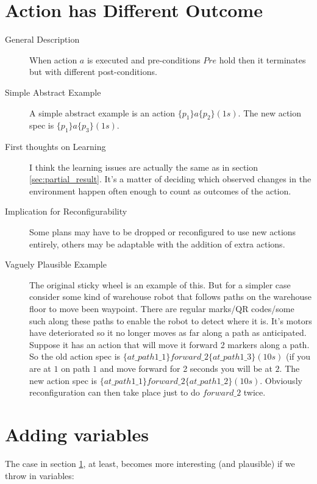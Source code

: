 \documentclass{blue-book}
\newcommand{\actionspec}[4]{\ensuremath{\{#1\}#2\{#3\}(#4)}}
\begin{document}
\section{Action has Different Outcome}
\label{sec:different}

\begin{description}
\item[General Description] When action $a$ is executed and pre-conditions $Pre$ hold then it terminates but with different post-conditions.

\item[Simple Abstract Example] A simple abstract example is an action \actionspec{p_1}{a}{p_2}{1s}.  The new action spec is \actionspec{p_1}{a}{p_3}{1s}.

\item[First thoughts on Learning]  I think the learning issues are actually the same as in section \ref{sec:partial_result}.  It's a matter of deciding which observed changes in the environment happen often enough to count as outcomes of the action.

\item[Implication for Reconfigurability]  Some plans may have to be dropped or reconfigured to use new actions entirely, others may be adaptable with the addition of extra actions.

\item[Vaguely Plausible Example] The original sticky wheel is an example of this.  But for a simpler case consider some kind of warehouse robot that follows paths on the warehouse floor to move been waypoint.  There are regular marks/QR codes/some such along these paths to enable the robot to detect where it is.  It's motors have deteriorated so it no longer moves as far along a path as anticipated.  Suppose it has an action that will move it forward 2 markers along a path.  So the old action spec is \actionspec{at\_path1\_1}{forward\_2}{at\_path1\_3}{10s} (if you are at $1$ on path $1$ and move forward for 2 seconds you will be at $2$.  The new action spec is  \actionspec{at\_path1\_1}{forward\_2}{at\_path1\_2}{10s}.  Obviously reconfiguration can then take place just to do $forward\_2$ twice.
\end{description}

\section{Adding variables}
\label{sec:vars}
The case in section \ref{sec:different}, at least, becomes more interesting (and plausible) if we throw in variables:
\end{document}
